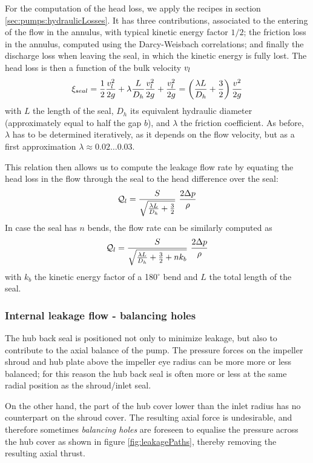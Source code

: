 For the computation of the head loss, we apply the recipes in section
\ref{sec:pumps:hydraulicLosses}. It has three contributions, associated to
the entering of the flow in the annulus, with typical kinetic energy
factor $1/2$; the friction loss in the annulus, computed using the
Darcy-Weisbach correlations; and finally the discharge loss when
leaving the seal, in which the kinetic energy is fully lost. The head
loss is then a function of the bulk velocity $v_l$
\begin{align*}
  \xi_{seal} = \frac{1}{2} 
  \frac{v^2_l}{2g} + 
  \lambda \frac{L}{D_h} \frac{v^2_l}{2g} + 
  \frac{v^2_l}{2 g} = 
  \left(\frac{\lambda L}{D_h} + \frac{3}{2}\right) \frac{v^2}{2g}
\end{align*}
with $L$ the length of the seal, $D_h$ its equivalent hydraulic
diameter (approximately equal to half the gap $b$), and $\lambda$ the
friction coefficient. As before, $\lambda$ has to be determined
iteratively, as it depends on the flow velocity, but as a first
approximation $\lambda \approx 0.02 \ldots 0.03$.

This relation then allows us to compute the leakage flow rate by
equating the head loss in the flow through the seal to the head
difference over the seal:
\begin{align*}
  \mathcal Q_l = \frac{S}{\sqrt{\frac{\lambda L}{D_h} + \frac{3}{2}}} ~ 
  \frac{2 \Delta p}{\rho}
\end{align*}
In case the seal has $n$ bends, the flow rate can be similarly
computed as
\begin{align*}
  \mathcal Q_l = \frac{S}{\sqrt{\frac{\lambda L}{D_h} + \frac{3}{2} + n k_b}} ~ 
  \frac{2 \Delta p}{\rho}
\end{align*}
with $k_b$ the kinetic energy factor of a 180$^\circ$ bend and $L$ the
total length of the seal.

\subsubsection{Internal leakage flow - balancing holes} 

The hub back seal is positioned not only to minimize leakage, but also
to contribute to the axial balance of the pump. The pressure forces on
the impeller shroud and hub plate above the impeller eye radius can be
more more or less balanced; for this reason the hub back seal is often
more or less at the same radial position as the shroud/inlet seal.

On the other hand, the part of the hub cover lower than the inlet
radius has no counterpart on the shroud cover. The resulting axial
force is undesirable, and therefore sometimes \emph{balancing holes}
are foreseen to equalise the pressure across the hub cover as shown in
figure \ref{fig:leakagePaths}, thereby removing the resulting axial
thrust.

